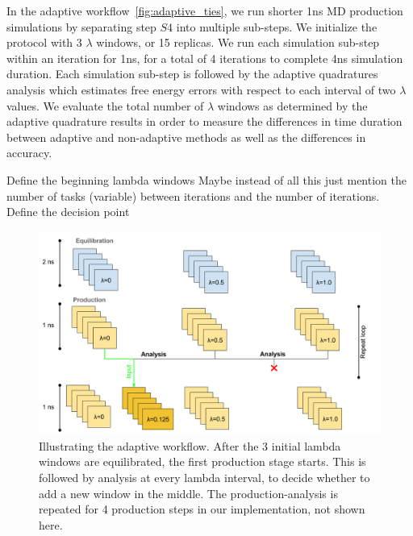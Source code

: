 In the adaptive workflow~\ref{fig:adaptive_ties}, we run shorter 1ns MD
production simulations by separating step $S4$ into multiple sub-steps. We 
initialize the protocol with 3 $\lambda$ windows, or 15 replicas. We run each 
simulation sub-step within an iteration for 1ns, for a total of 4 iterations to 
complete 4ns simulation duration. Each simulation sub-step is followed by the 
adaptive quadratures analysis
which estimates free energy errors with respect to each interval of
two $\lambda$ values. We evaluate the total number of $\lambda$ windows as 
determined by the adaptive quadrature results in order to measure the 
differences in time duration between adaptive and non-adaptive methods as well
as the differences in accuracy. 



Define the beginning lambda windows 
Maybe instead of all this just mention the number of tasks (variable) between 
iterations and the number of iterations. Define the decision point




\begin{figure}
  \centering
  \includegraphics[width=\columnwidth]{figures/Adaptive_TIES_1.png}
  \caption{Illustrating the adaptive workflow. After the 3
  initial lambda windows are equilibrated, the first production stage starts.
  This is followed by analysis at every lambda interval, to decide whether to
  add a new window in the middle. The production-analysis is repeated for 4
  production steps in our implementation, not shown here.}
\label{fig:adaptive_TIES}
\end{figure}


